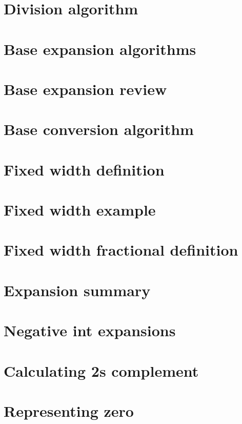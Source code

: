 \section*{Division algorithm}

\vfill
\section*{Base expansion algorithms}

\vfill
\section*{Base expansion review}

\vfill
\section*{Base conversion algorithm}

\vfill
\section*{Fixed width definition}

\vfill
\section*{Fixed width example}

\vfill
\section*{Fixed width fractional definition}

\vfill
\section*{Expansion summary}

\vfill
\section*{Negative int expansions}

\vfill
\section*{Calculating 2s complement}

\vfill
\section*{Representing zero}

\vfill
